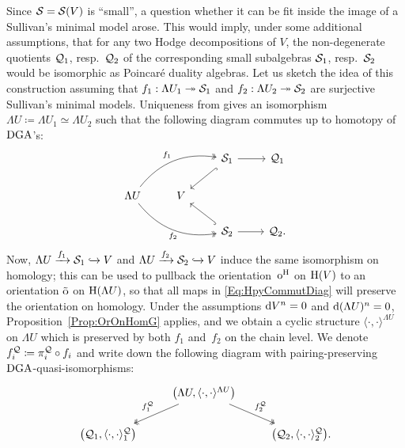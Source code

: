 \documentclass[\MainFolder/Text.tex]{subfiles}
\begin{document}
Since $\mathcal{S}=\mathcal{S}(V)$ is ``small'', a question whether it can be fit inside the image of a Sullivan's minimal model arose. This would imply, under some additional assumptions, that for any two Hodge decompositions of $V$, the non-degenerate quotients $\mathcal{Q}_1$, resp.~$\mathcal{Q}_2$ of the corresponding small subalgebras $\mathcal{S}_1$, resp.~$\mathcal{S}_2$ would be isomorphic as Poincar\'e duality algebras. Let us sketch the idea of this construction assuming that $f_1: \Lambda U_1 \twoheadrightarrow \mathcal{S}_1$ and $f_2: \Lambda U_2 \twoheadrightarrow \mathcal{S}_2$ are surjective Sullivan's minimal models. Uniqueness from \cite[Theorem~2.24]{Felix2008} gives an isomorphism $\Lambda U \coloneqq \Lambda U_1 \simeq \Lambda U_2$ such that the following diagram commutes up to homotopy of $\mathrm{DGA}$'s:
\begin{equation}\label{Eq:HpyCommutDiag}
\begin{tikzcd}
& & \VansSmall_1 \arrow[hook]{ld}\arrow{r} & \VansQuotient_1 \\
\Lambda U \arrow[bend left,two heads]{rru}{f_1}\arrow[bend right,two heads]{rrd}[below]{f_2}  &  V & &  \\
& & \VansSmall_2 \arrow[hook]{lu}\arrow{r}& \VansQuotient_2.
\end{tikzcd}
\end{equation}
Now, $\Lambda U \xrightarrow{f_1} \mathcal{S}_1 \xhookrightarrow{} V$ and $\Lambda U \xrightarrow{f_2} \mathcal{S}_2 \xhookrightarrow{} V$ induce the same isomorphism on homology; this can be used to pullback the orientation~$\mathrm{o}^{\mathrm{H}}$ on $\mathrm{H}(V)$ to an orientation $\tilde{\mathrm{o}}$ on $\mathrm{H}(\Lambda U)$, so that all maps in \eqref{Eq:HpyCommutDiag} will preserve the orientation on homology. Under the assumptions $\mathrm{d} V^n = 0$ and $\mathrm{d} (\Lambda U)^n = 0$, Proposition~\ref{Prop:OrOnHomG} applies, and we obtain a cyclic structure $\langle\cdot,\cdot\rangle^{\Lambda U}$ on $\Lambda U$ which is preserved by both $f_1$ and~$f_2$ on the chain level. We denote $f_i^{\mathcal{Q}}\coloneqq \pi^{\mathcal{Q}}_i \circ f_i$ and write down the following diagram with pairing-preserving $\mathrm{DGA}$-quasi-isomorphisms:
\begin{equation}\label{Eq:Diagram}
\begin{tikzcd}
& \arrow[two heads,swap]{ld}{f_1^\VansQuotient} \bigl(\Lambda U,\langle\cdot,\cdot\rangle^{\Lambda U}\bigr)\arrow[two heads]{rd}{f_2^\VansQuotient}& \\
\bigl(\VansQuotient_1,\langle\cdot,\cdot\rangle^{\VansQuotient}_1\bigr) & & \bigl(\VansQuotient_2,\langle\cdot,\cdot\rangle^{\VansQuotient}_2 \bigr).
\end{tikzcd}
\end{equation}
\end{document}
